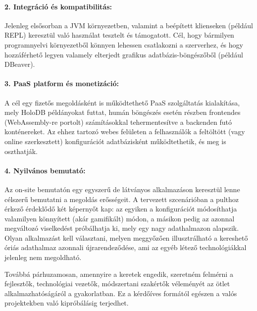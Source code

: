\documentclass[12pt]{article}
\begin{document}
\paragraph{2. Integráció és kompatibilitás:}
Jelenleg elsősorban a JVM környezetben, valamint a beépített klienseken (például REPL) keresztül való használat tesztelt és támogatott.
Cél, hogy bármilyen programnyelvi környezetből könnyen lehessen csatlakozni a szerverhez,
és hogy hozzáférhető legyen valamely elterjedt grafikus adatbázis-böngészőből (például DBeaver).

\paragraph{3. PaaS platform és monetizáció:}
A cél egy fizetős megoldásként is működtethető \mbox{PaaS} szolgáltatás kialakítása,
mely HoloDB példányokat futtat,
humán böngészés esetén részben frontendes (WebAssembly-re portolt) számításokkal tehermentesítve a backenden futó konténereket.
Az ehhez tartozó webes felületen a felhasználók a feltöltött (vagy online szerkesztett)
konfigurációt adatbázisként működtethetik, és meg is oszthatják.

\paragraph{4. Nyilvános bemutató:}
Az on-site bemutatón egy egyszerű de látványos alkalmazáson keresztül lenne célszerű bemutatni a megoldás erősségeit.
A tervezett szcenárióban a pulthoz érkező érdeklődő két képernyőt kap:
az egyiken a konfigurációt módosíthatja valamilyen könnyített (akár gamifikált) módon,
a másikon pedig az azonnal megváltozó viselkedést próbálhatja ki, mely egy nagy adathalmazon alapszik.
Olyan alkalmazást kell választani, melyen meggyőzően illusztrálható a kereshető óriás adathalmaz azonnali újrarendeződése,
ami az egyéb létező technológiákkal jelenleg nem megoldható.

Továbbá párhuzamosan, amennyire a keretek engedik,
szeretném felmérni a fejlesztők, technológiai vezetők, módszertani szakértők véleményét az ötlet alkalmazhatóságáról a gyakorlatban.
Ez a kérdőíves formától egészen a valós projektekben való kipróbálásig terjedhet.
\end{document}
